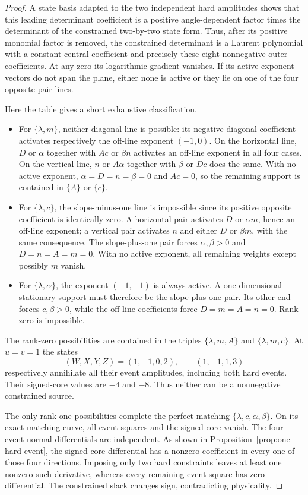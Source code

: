 \begin{proof}
A state basis adapted to the two independent hard amplitudes shows that this leading determinant coefficient is a positive angle-dependent factor times the determinant of the constrained two-by-two state form. Thus, after its positive monomial factor is removed, the constrained determinant is a Laurent polynomial with a constant central coefficient and precisely these eight nonnegative outer coefficients. At any zero its logarithmic gradient vanishes. If its active exponent vectors do not span the plane, either none is active or they lie on one of the four opposite-pair lines.

Here the table gives a short exhaustive classification.
\begin{itemize}
\item For $\{\lambda,m\}$, neither diagonal line is possible: its negative diagonal coefficient activates respectively the off-line exponent $(-1,0)$. On the horizontal line, $D$ or $\alpha$ together with $Ac$ or $\beta n$ activates an off-line exponent in all four cases. On the vertical line, $n$ or $A\alpha$ together with $\beta$ or $Dc$ does the same. With no active exponent, $\alpha=D=n=\beta=0$ and $Ac=0$, so the remaining support is contained in $\{A\}$ or $\{c\}$.
\item For $\{\lambda,c\}$, the slope-minus-one line is impossible since its positive opposite coefficient is identically zero. A horizontal pair activates $D$ or $\alpha m$, hence an off-line exponent; a vertical pair activates $n$ and either $D$ or $\beta m$, with the same consequence. The slope-plus-one pair forces $\alpha,\beta>0$ and $D=n=A=m=0$. With no active exponent, all remaining weights except possibly $m$ vanish.
\item For $\{\lambda,\alpha\}$, the exponent $(-1,-1)$ is always active. A one-dimensional stationary support must therefore be the slope-plus-one pair. Its other end forces $c,\beta>0$, while the off-line coefficients force $D=m=A=n=0$. Rank zero is impossible.
\end{itemize}

The rank-zero possibilities are contained in the triples
$\{\lambda,m,A\}$ and $\{\lambda,m,c\}$. At $u=v=1$ the states
\[
 (W,X,Y,Z)=(1,-1,0,2),\qquad(1,-1,1,3)
\]
respectively annihilate all their event amplitudes, including both hard events. Their signed-core values are $-4$ and $-8$. Thus neither can be a nonnegative constrained source.

The only rank-one possibilities complete the perfect matching
$\{\lambda,c,\alpha,\beta\}$. On its exact matching curve, all event squares and the signed core vanish. The four event-normal differentials are independent. As shown in Proposition~\ref{prop:one-hard-event}, the signed-core differential has a nonzero coefficient in every one of those four directions. Imposing only two hard constraints leaves at least one nonzero such derivative, whereas every remaining event square has zero differential. The constrained slack changes sign, contradicting physicality.


\end{proof}
